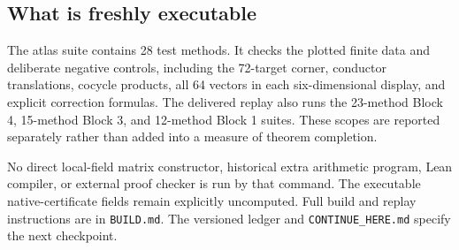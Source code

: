 \documentclass[11pt]{article}
\begin{document}
\subsection*{What is freshly executable}
The atlas suite contains 28 test methods. It checks the plotted finite data and deliberate negative controls, including the 72-target corner, conductor translations, cocycle products, all 64 vectors in each six-dimensional display, and explicit correction formulas. The delivered replay also runs the 23-method Block 4, 15-method Block 3, and 12-method Block 1 suites. These scopes are reported separately rather than added into a measure of theorem completion.

No direct local-field matrix constructor, historical extra arithmetic program, Lean compiler, or external proof checker is run by that command. The executable native-certificate fields remain explicitly uncomputed. Full build and replay instructions are in \texttt{BUILD.md}. The versioned ledger and \texttt{CONTINUE\_HERE.md} specify the next checkpoint.
\end{document}
